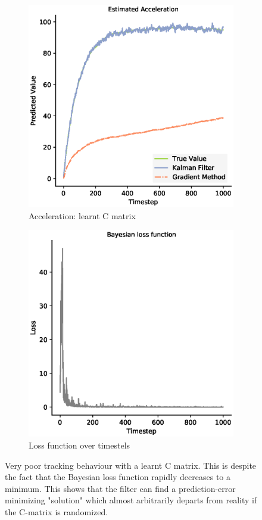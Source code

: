 \begin{figure}
\begin{subfigure}{0.33\textwidth}
    \centering
    \includegraphics[width=.8\linewidth]{chapter_3_figures/Estimated_Acceleration_C_matrix.eps}
    \caption{Acceleration: learnt C matrix}
  \end{subfigure}
  \medskip

  \begin{subfigure}{0.5\textwidth}
    \centering
    \includegraphics[width=.8\linewidth]{chapter_3_figures/NKF_C_matrix_loss.eps}
    \caption{Loss function over timestels}
  \end{subfigure}
  
  \caption{Very poor tracking behaviour with a learnt C matrix. This is despite the fact that the Bayesian loss function rapidly decreases to a minimum. This shows that the filter can find a prediction-error minimizing "solution" which almost arbitrarily departs from reality if the C-matrix is randomized.}
  
\label{KF_learn_C_figure}
\end{figure}

